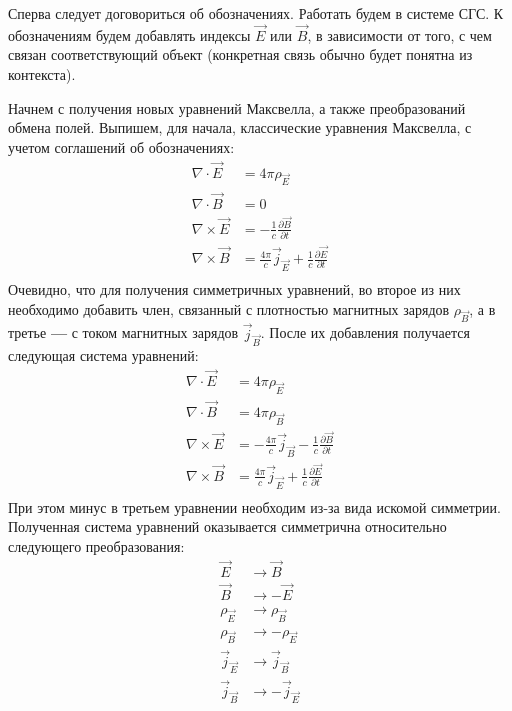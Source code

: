 \documentclass[oneside,final,14pt]{extarticle}
\begin{document}
	Сперва следует договориться об обозначениях. Работать будем в системе СГС. К обозначениям будем добавлять индексы $\vec E$ или $\vec B$, в зависимости от того, с чем связан соответствующий объект (конкретная связь обычно будет понятна из контекста). 

	Начнем с получения новых уравнений Максвелла, а также преобразований обмена полей. Выпишем, для начала, классические уравнения Максвелла, с учетом соглашений об обозначениях: 
$$
\begin{aligned} 
\nabla \cdot \vec E & = 4\pi\rho_{\vec E} \\
\nabla \cdot \vec B & = 0 \\
\nabla \times \vec E & = -\frac{1}{c}\frac{\partial \vec B}{\partial t} \\
\nabla \times \vec B & = \frac{4\pi}{c}\vec j_{\vec E}+\frac{1}{c}\frac{\partial \vec E}{\partial t} \\
\end{aligned}
$$
Очевидно, что для получения симметричных уравнений, во второе из них необходимо добавить член, связанный с плотностью магнитных зарядов $\rho_{\vec B}$, а в третье \textbf{---} с током магнитных зарядов $\vec j_{\vec B}$. После их добавления получается следующая система уравнений:
$$
\begin{aligned} 
\nabla \cdot \vec E & = 4\pi\rho_{\vec E} \\
\nabla \cdot \vec B & =4\pi\rho_{\vec B} \\
\nabla \times \vec E & = -\frac{4\pi}{c}\vec j_{\vec B}-\frac{1}{c}\frac{\partial \vec B}{\partial t} \\
\nabla \times \vec B & = \frac{4\pi}{c}\vec j_{\vec E}+\frac{1}{c}\frac{\partial \vec E}{\partial t} \\
\end{aligned}
$$
При этом минус в третьем уравнении необходим из-за вида искомой симметрии. Полученная система уравнений оказывается симметрична относительно следующего преобразования:
$$
\begin{aligned} 
\vec E & \rightarrow \vec B \\
\vec B & \rightarrow -\vec E \\
\rho_{\vec E} & \rightarrow \rho_{\vec B} \\
\rho_{\vec B} & \rightarrow -\rho_{\vec E} \\
\vec j_{\vec E} & \rightarrow \vec j_{\vec B} \\
\vec j_{\vec B} & \rightarrow -\vec j_{\vec E} \\
\end{aligned}
$$
\end{document}
